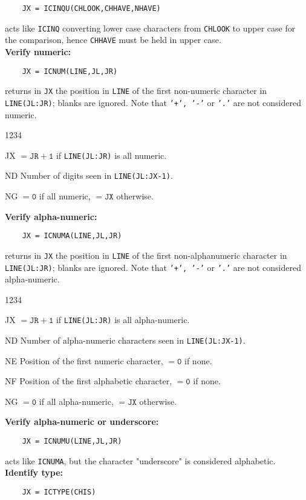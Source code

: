 \begin{verbatim}
    JX = ICINQU(CHLOOK,CHHAVE,NHAVE)
\end{verbatim}
acts like {\tt ICINQ} converting lower case characters from {\tt CHLOOK}
to upper case for the comparison, hence {\tt CHHAVE} must be held
in upper case. \\[2mm]
{\bf Verify numeric:}
\begin{verbatim}
    JX = ICNUM(LINE,JL,JR)
\end{verbatim}
returns in {\tt JX} the position in {\tt LINE} of the first non-numeric
character in {\tt LINE(JL:JR)};  blanks are ignored. Note that
{\tt '+', '-'} or {\tt '.'} are not considered numeric.
\begin{DLtt}{1234}
\item [JX] $\mathtt{=JR+1}$ if {\tt LINE(JL:JR)} is all numeric.
\item [ND] Number of digits seen in {\tt LINE(JL:JX-1)}.
\item [NG] $\mathtt{=0}$ if all numeric, $\mathtt{=JX}$ otherwise.
\end{DLtt}
{\bf Verify alpha-numeric:}
\begin{verbatim}
    JX = ICNUMA(LINE,JL,JR)
\end{verbatim}
returns in {\tt JX} the position in {\tt LINE} of the first
non-alphanumeric character in {\tt LINE(JL:JR)}; blanks are ignored.
Note that {\tt '+', '-'} or {\tt '.'} are not considered alpha-numeric.
\begin{DLtt}{1234}
\item [JX] $\mathtt{=JR+1}$ if {\tt LINE(JL:JR)} is all alpha-numeric.
\item[ND] Number of alpha-numeric characters seen in
{\tt LINE(JL:JX-1)}.
\item[NE] Position of the first numeric character, $\mathtt{=0}$ if none.
\item[NF] Position of the first alphabetic character, $\mathtt{=0}$ if
none.
\item[NG] $\mathtt{=0}$ if all alpha-numeric, $\mathtt{= JX}$ otherwise.
\end{DLtt}
{\bf Verify alpha-numeric or underscore:}
\begin{verbatim}
    JX = ICNUMU(LINE,JL,JR)
\end{verbatim}
acts like {\tt ICNUMA}, but the character "underscore" is considered
alphabetic. \\[2mm]
{\bf Identify type:}
\begin{verbatim}
    JX = ICTYPE(CHIS)
\end{verbatim}
